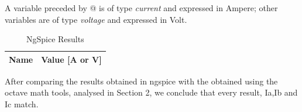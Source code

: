 A variable preceded by @ is of type {\em current} and expressed in Ampere; other variables are of type {\it voltage} and expressed in
    Volt.
\begin{table}[h]
  \centering
  \begin{tabular}{|l|r|}
    \hline    
    {\bf Name} & {\bf Value [A or V]} \\ \hline
    
  \end{tabular}
  \caption{NgSpice Results}
  \label{tab:op}
\end{table}

After comparing the results obtained in ngspice with the obtained using the octave math tools, analysed in Section 2, we conclude that every result, Ia,Ib and Ic match.



